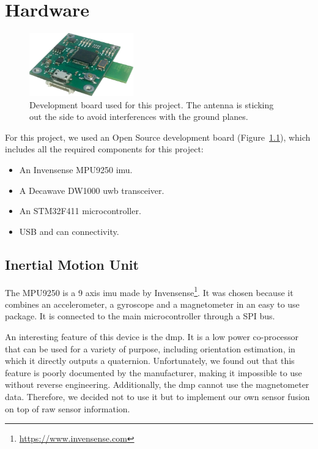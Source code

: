 \documentclass[a4paper, 12pt]{scrreprt}
\begin{document}
\chapter{Hardware}


\begin{figure}[h]
    \centering
    \includegraphics[width=0.4\textwidth]{figures/board.jpg}
    \caption{Development board used for this project.
        The antenna is sticking out the side to avoid interferences with the ground planes.
    \label{fig:board}
    }
\end{figure}

For this project, we used an Open Source development board (Figure~\ref{fig:board}), which includes all the required components for this project:

\begin{itemize}
    \item An Invensense MPU9250 \gls{imu}.
    \item A Decawave DW1000 \gls{uwb} transceiver.
    \item An STM32F411 microcontroller.
    \item USB and \gls{can} connectivity.
\end{itemize}

\section{Inertial Motion Unit}

The MPU9250 is a 9 axis \gls{imu} made by Invensense\footnote{\url{https://www.invensense.com}}.
It was chosen because it combines an accelerometer, a gyroscope and a magnetometer in an easy to use package.
It is connected to the main microcontroller through a SPI bus.

An interesting feature of this device is the \gls{dmp}.
It is a low power co-processor that can be used for a variety of purpose, including orientation estimation, in which it directly outputs a quaternion.
Unfortunately, we found out that this feature is poorly documented by the manufacturer, making it impossible to use without reverse engineering.
Additionally, the \gls{dmp} cannot use the magnetometer data.
Therefore, we decided not to use it but to implement our own sensor fusion on top of raw sensor information.
\end{document}
